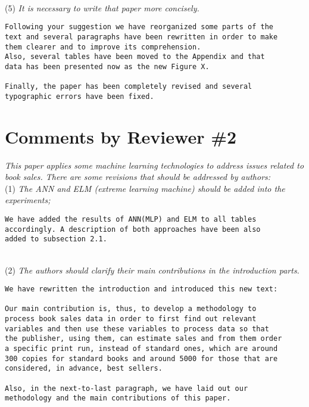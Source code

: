 \documentclass[preprint]{elsarticle}
\begin{document}
~\\
\noindent (5) \emph{It is necessary to write that paper more concisely. } 

\begin{verbatim}
Following your suggestion we have reorganized some parts of the 
text and several paragraphs have been rewritten in order to make 
them clearer and to improve its comprehension. 
Also, several tables have been moved to the Appendix and that
data has been presented now as the new Figure X.

Finally, the paper has been completely revised and several 
typographic errors have been fixed.
\end{verbatim}



\section{Comments by Reviewer \#2}

\noindent \emph{This paper applies some machine learning technologies to address issues related to book sales. There are some revisions that should be addressed by authors: } \\


\noindent (1) \emph{The ANN and ELM (extreme learning machine) should be added into the experiments; } 

\begin{verbatim}
We have added the results of ANN(MLP) and ELM to all tables 
accordingly. A description of both approaches have been also 
added to subsection 2.1.
\end{verbatim}

~\\
\noindent (2) \emph{The authors should clarify their main contributions in the introduction parts.}

\begin{verbatim}
We have rewritten the introduction and introduced this new text:

Our main contribution is, thus, to develop a methodology to 
process book sales data in order to first find out relevant 
variables and then use these variables to process data so that 
the publisher, using them, can estimate sales and from them order 
a specific print run, instead of standard ones, which are around 
300 copies for standard books and around 5000 for those that are 
considered, in advance, best sellers.

Also, in the next-to-last paragraph, we have laid out our 
methodology and the main contributions of this paper.
\end{verbatim}
\end{document}
